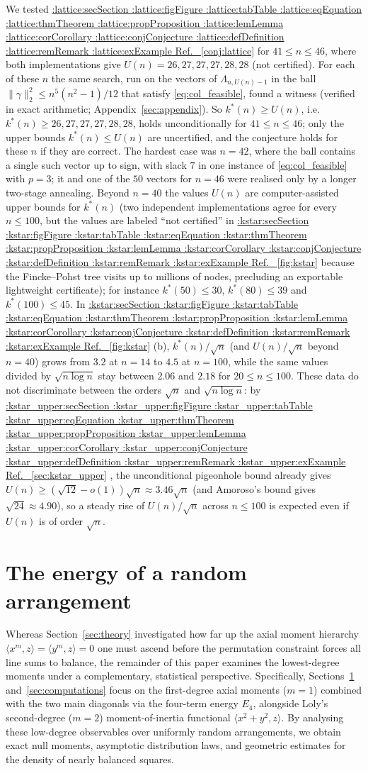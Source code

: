 \documentclass[11pt,a4paper]{article}
\makeatletter
\def\Cref@getprefix#1:#2\relax{#1}
\def\Cref@prefix@sec{sec}
\def\Cref@prefix@fig{fig}
\def\Cref@prefix@tab{tab}
\def\Cref@prefix@eq{eq}
\def\Cref@prefix@thm{thm}
\def\Cref@prefix@prop{prop}
\def\Cref@prefix@lem{lem}
\def\Cref@prefix@cor{cor}
\def\Cref@prefix@conj{conj}
\def\Cref@prefix@def{def}
\def\Cref@prefix@rem{rem}
\def\Cref@prefix@ex{ex}
\def\Cref@type@cap#1{%
  \edef\Cref@tmp{#1}%
  \ifx\Cref@tmp\Cref@prefix@sec Section%
  \else\ifx\Cref@tmp\Cref@prefix@fig Figure%
  \else\ifx\Cref@tmp\Cref@prefix@tab Table%
  \else\ifx\Cref@tmp\Cref@prefix@eq Equation%
  \else\ifx\Cref@tmp\Cref@prefix@thm Theorem%
  \else\ifx\Cref@tmp\Cref@prefix@prop Proposition%
  \else\ifx\Cref@tmp\Cref@prefix@lem Lemma%
  \else\ifx\Cref@tmp\Cref@prefix@cor Corollary%
  \else\ifx\Cref@tmp\Cref@prefix@conj Conjecture%
  \else\ifx\Cref@tmp\Cref@prefix@def Definition%
  \else\ifx\Cref@tmp\Cref@prefix@rem Remark%
  \else\ifx\Cref@tmp\Cref@prefix@ex Example%
  \else Ref.%
  \fi\fi\fi\fi\fi\fi\fi\fi\fi\fi\fi\fi
}
\DeclareRobustCommand{\Cref}[1]{%
  \begingroup
  \edef\Cref@label{#1}%
  \edef\Cref@prefix{\expandafter\Cref@getprefix\Cref@label:\relax}%
  \hyperref[#1]{\Cref@type@cap{\Cref@prefix}~\ref*{#1}}%
  \endgroup
}
\theoremstyle{plain}
\theoremstyle{definition}
\theoremstyle{remark}
\newcommand{\Efour}{E_4}
\makeatother
\begin{document}
We tested \Cref{conj:lattice} for $41\le n\le46$, where both implementations give $U(n)=26,27,27,27,28,28$ (not certified).
For each of these $n$ the same search, run on the vectors of $\Lambda_{n,U(n)-1}$ in the ball $\|\gamma\|_2^2\le n^5(n^2-1)/12$ that satisfy \eqref{eq:col_feasible}, found a witness (verified in exact arithmetic; Appendix~\ref{sec:appendix}).
So $k^*(n)\ge U(n)$, i.e.\ $k^*(n)\ge26,27,27,27,28,28$, holds unconditionally for $41\le n\le46$; only the upper bounds $k^*(n)\le U(n)$ are uncertified, and the conjecture holds for these $n$ if they are correct.
The hardest case was $n=42$, where the ball contains a single such vector up to sign, with slack $7$ in one instance of \eqref{eq:col_feasible} with $p=3$; it and one of the $50$ vectors for $n=46$ were realised only by a longer two-stage annealing.
Beyond $n=40$ the values $U(n)$ are computer-assisted upper bounds for $k^*(n)$ (two independent implementations agree for every $n\le100$, but the values are labeled ``not certified'' in \Cref{fig:kstar} because the Fincke--Pohst tree visits up to millions of nodes, precluding an exportable lightweight certificate); for instance $k^*(50)\le30$, $k^*(80)\le39$ and $k^*(100)\le45$.
In \Cref{fig:kstar}(b), $k^*(n)/\sqrt n$ (and $U(n)/\sqrt n$ beyond $n=40$) grows from $3.2$ at $n=14$ to $4.5$ at $n=100$, while the same values divided by $\sqrt{n\log n}$ stay between $2.06$ and $2.18$ for $20\le n\le100$.
These data do not discriminate between the orders $\sqrt n$ and $\sqrt{n\log n}$: by \Cref{sec:kstar_upper}, the unconditional pigeonhole bound already gives $U(n)\ge(\sqrt{12}-o(1))\sqrt n\approx3.46\sqrt n$ (and Amoroso's bound gives $\sqrt{24}\approx4.90$), so a steady rise of $U(n)/\sqrt n$ across $n\le100$ is expected even if $U(n)$ is of order $\sqrt n$.


\section{The energy of a random arrangement}
\label{sec:random_energy}

Whereas Section~\ref{sec:theory} investigated how far up the axial moment hierarchy $\langle x^m,z\rangle=\langle y^m,z\rangle=0$ one must ascend before the permutation constraint forces all line sums to balance, the remainder of this paper examines the lowest-degree moments under a complementary, statistical perspective.
Specifically, Sections~\ref{sec:random_energy} and~\ref{sec:computations} focus on the first-degree axial moments ($m=1$) combined with the two main diagonals via the four-term energy $\Efour$, alongside Loly's second-degree ($m=2$) moment-of-inertia functional $\langle x^2+y^2,z\rangle$.
By analysing these low-degree observables over uniformly random arrangements, we obtain exact null moments, asymptotic distribution laws, and geometric estimates for the density of nearly balanced squares.
\end{document}

